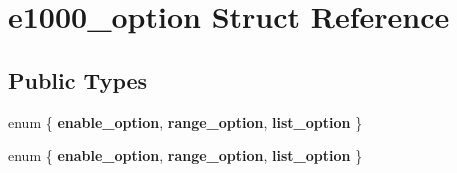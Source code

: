 \hypertarget{structe1000__option}{
\section{e1000\_\-option Struct Reference}
\label{structe1000__option}
}
\subsection*{Public Types}
\begin{DoxyCompactItemize}
\item 
enum \{ {\bfseries enable\_\-option}, 
{\bfseries range\_\-option}, 
{\bfseries list\_\-option}
 \}
\item 
enum \{ {\bfseries enable\_\-option}, 
{\bfseries range\_\-option}, 
{\bfseries list\_\-option}
 \}
\end{DoxyCompactItemize}
